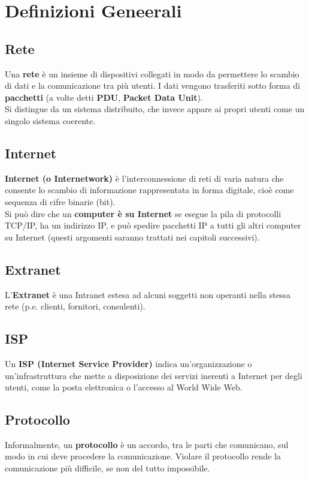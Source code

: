 \section{Definizioni Geneerali}
    \subsection{Rete}
        Una \textbf{rete} è un insieme di dispositivi collegati in modo da permettere lo scambio di dati e la
        comunicazione tra più utenti. I dati vengono trasferiti sotto forma di \textbf{pacchetti} (a volte detti
        \textbf{PDU}, \textbf{Packet Data Unit}).\\
        
        Si distingue da un sistema distribuito, che invece appare ai propri utenti come un singolo
        sistema coerente.

    \subsection{Internet}
        \textbf{Internet (o Internetwork)} è l’interconnessione di reti di varia natura che consente lo scambio
        di informazione rappresentata in forma digitale, cioè come sequenza di cifre binarie (bit).\\

        Si può dire che un \textbf{computer è su Internet} se esegue la pila di protocolli TCP/IP, ha un indirizzo
        IP, e può spedire pacchetti IP a tutti gli altri computer su Internet (questi argomenti saranno
        trattati nei capitoli successivi).

    \subsection{Extranet}
        L’\textbf{Extranet} è una Intranet estesa ad alcuni soggetti non operanti nella stessa rete (p.e. clienti,
        fornitori, consulenti).

    \subsection{ISP}
        Un \textbf{ISP (Internet Service Provider)} indica un’organizzazione o un’infrastruttura che mette a
        disposizione dei servizi inerenti a Internet per degli utenti, come la posta elettronica o l’accesso
        al World Wide Web.

    \subsection{Protocollo}
        Informalmente, un \textbf{protocollo} è un accordo, tra le parti che comunicano, sul modo in cui deve
        procedere la comunicazione. Violare il protocollo rende la comunicazione più difficile, se non
        del tutto impossibile.\\

